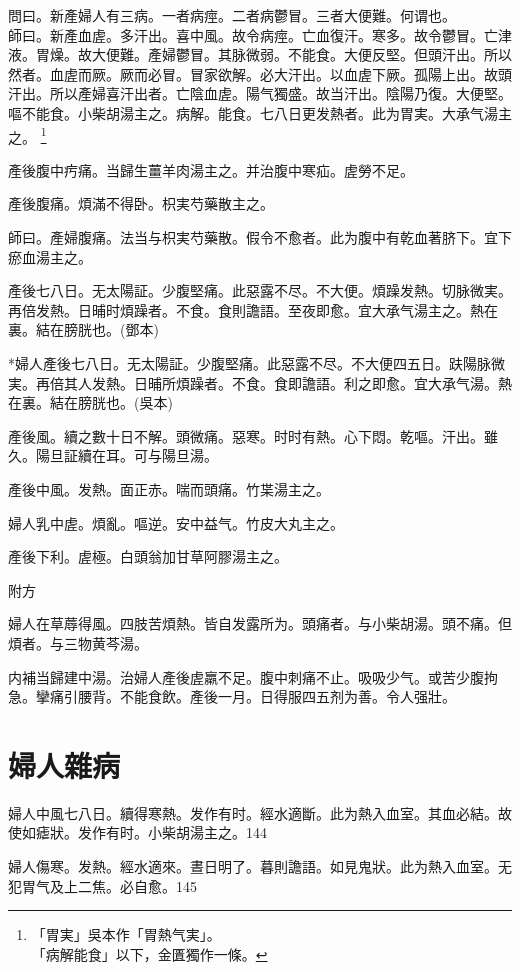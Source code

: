 \documentclass[b5paper,twoside,zihao=-4,UTF8]{ctexbook}
\begin{document}
問曰。新產婦人有三病。一者病痙。二者病鬱冒。三者大便難。何谓也。\\
師曰。新產血虗。多汗出。喜中風。故令病痙。亡血復汗。寒多。故令鬱冒。亡津液。胃燥。故大便難。產婦鬱冒。其脉微弱。不能食。大便反堅。但頭汗出。所以然者。血虗而厥。厥而必冒。冒家欲解。必大汗出。以血虗下厥。孤陽上出。故頭汗出。所以產婦喜汗出者。亡陰血虗。陽气獨盛。故当汗出。陰陽乃復。大便堅。嘔不能食。小柴胡湯主之。病解。能食。七八日更发熱者。此为胃実。大承气湯主之。
	\footnote{「胃実」吳本作「胃熱气実」。\\「病解能食」以下，金匱獨作一條。}

產後腹中㽲痛。当歸生薑羊肉湯主之。并治腹中寒疝。虗勞不足。

產後腹痛。煩滿不得卧。枳実芍藥散主之。

師曰。產婦腹痛。法当与枳実芍藥散。假令不愈者。此为腹中有乾血著脐下。宜下瘀血湯主之。

產後七八日。无太陽証。少腹堅痛。此惡露不尽。不大便。煩躁发熱。切脉微実。再倍发熱。日晡时煩躁者。不食。食則譫語。至夜即愈。宜大承气湯主之。熱在裏。結在膀胱也。(鄧本)

*婦人產後七八日。无太陽証。少腹堅痛。此惡露不尽。不大便四五日。趺陽脉微実。再倍其人发熱。日晡所煩躁者。不食。食即譫語。利之即愈。宜大承气湯。熱在裏。結在膀胱也。(吳本)

產後風。續之數十日不解。頭微痛。惡寒。时时有熱。心下悶。乾嘔。汗出。雖久。陽旦証續在耳。可与陽旦湯。

產後中風。发熱。面{正}赤。喘而頭痛。竹枼湯主之。

婦人乳中虗。煩亂。嘔逆。安中益气。竹皮大丸主之。

產後下利。虗極。白頭翁加甘草阿膠湯主之。

附方

婦人在草蓐得風。四肢苦煩熱。皆自发露所为。頭痛者。与小柴胡湯。頭不痛。但煩者。与三物黄芩湯。

内補当歸建中湯。治婦人產後虗羸不足。腹中刺痛不止。吸吸少气。或苦少腹拘急。攣痛引腰背。不能食飲。產後一月。日得服四五剂为善。令人强壯。

\chapter{婦人雜病}

婦人中風七八日。續得寒熱。发作有时。經水適斷。此为熱入血室。其血必結。故使如瘧狀。发作有时。小柴胡湯主之。144

婦人傷寒。发熱。經水適來。晝日明了。暮則譫語。如見鬼狀。此为熱入血室。无犯胃气及上二焦。必自愈。145
\end{document}
